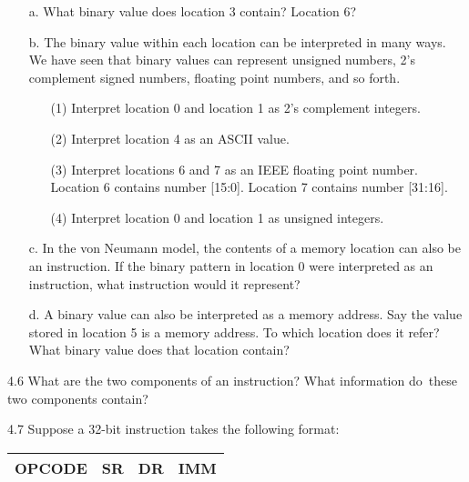 \documentclass{patt}
\begin{document}
\begin{exercises}
\begin{enumerate}
       \item[a.] What binary value does
        location 3 contain?  Location 6?

\item[b.] The binary value within each location can be
        interpreted in many ways. We have seen that binary
        values can represent unsigned numbers, 2's complement
        signed numbers, floating point numbers, and so forth.

\begin{enumerate}[(3)]
\item[\rm(1)] Interpret location 0 and location 1 as 2's complement integers.

\item[\rm(2)] Interpret location 4 as an ASCII value.

\item[\rm(3)] Interpret locations 6 and 7 as an IEEE floating point number.
Location 6 contains number [15:0]. Location 7 contains number [31:16].

\item[\rm(4)] Interpret location 0 and location 1 as unsigned integers.
\end{enumerate}

\item[c.] In the von Neumann model, the contents of a memory location
  can also be an instruction.  If the binary pattern in location 0
  were interpreted as an instruction, what instruction would it
  represent?

\item[d.]  A binary value can also be interpreted as a memory address.
  Say the value stored in location 5 is a memory address.  To which
  location does it refer?  What binary value does that location
  contain?
\end{enumerate}

\item[4.6]
What are the two components of an instruction? What information do~these
two components contain?

\item[4.7]
Suppose a 32-bit instruction takes the following format:

\begin{center}
\begin{tabular}{|c|c|c|c|} \hline
\rule{0pt}{10pt}OPCODE\rule{0pt}{10pt} & SR & DR & IMM \\ \hline
\end{tabular}
\end{center}


\end{exercises}
\end{document}

